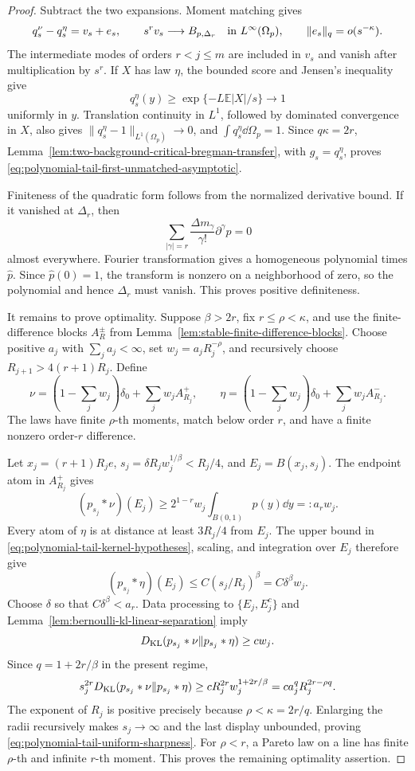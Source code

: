 \begin{proof}
Subtract the two expansions.  Moment matching gives
\[
 q_s^\nu-q_s^\eta=v_s+e_s,
 \qquad
 s^rv_s\longrightarrow B_{p,\Delta_r}\quad\hbox{in }L^\infty(\Omega_p),
 \qquad
 \|e_s\|_q=o(s^{-\kappa}).
\]
The intermediate modes of orders \(r<j\le m\) are included in \(v_s\)
and vanish after multiplication by \(s^r\).  If \(X\) has law \(\eta\),
the bounded score and Jensen's inequality give
\[
 q_s^\eta(y)\ge\exp\{-L\mathbb E|X|/s\}\longrightarrow1
\]
uniformly in \(y\).  Translation continuity in \(L^1\), followed by
dominated convergence in \(X\), also gives
\(\|q_s^\eta-1\|_{L^1(\Omega_p)}\to0\), and
\(\int q_s^\eta\dd\Omega_p=1\).  Since \(q\kappa=2r\),
Lemma~\ref{lem:two-background-critical-bregman-transfer}, with
\(g_s=q_s^\eta\), proves
\eqref{eq:polynomial-tail-first-unmatched-asymptotic}.

Finiteness of the quadratic form follows from the normalized derivative
bound.  If it vanished at \(\Delta_r\), then
\[
 \sum_{|\gamma|=r}\frac{\Delta m_\gamma}{\gamma!}\partial^\gamma p=0
\]
almost everywhere.  Fourier transformation gives a homogeneous polynomial
times \(\widehat p\).  Since \(\widehat p(0)=1\), the transform is nonzero
on a neighborhood of zero, so the polynomial and hence \(\Delta_r\) must
vanish.  This proves positive definiteness.

It remains to prove optimality.  Suppose \(\beta>2r\), fix
\(r\le\rho<\kappa\), and use the finite-difference blocks
\(A_R^\pm\) from Lemma~\ref{lem:stable-finite-difference-blocks}.  Choose
positive \(a_j\) with \(\sum_ja_j<\infty\), set
\(w_j=a_jR_j^{-\rho}\), and recursively choose
\(R_{j+1}>4(r+1)R_j\).  Define
\[
 \nu=\left(1-\sum_jw_j\right)\delta_0+\sum_jw_jA_{R_j}^+,
 \qquad
 \eta=\left(1-\sum_jw_j\right)\delta_0+\sum_jw_jA_{R_j}^-.
\]
The laws have finite \(\rho\)-th moments, match below order \(r\), and
have a finite nonzero order-\(r\) difference.

Let \(x_j=(r+1)R_je\),
\(s_j=\delta R_jw_j^{1/\beta}<R_j/4\), and
\(E_j=B(x_j,s_j)\).  The endpoint atom in \(A_{R_j}^+\) gives
\[
 (p_{s_j}*\nu)(E_j)\ge
 2^{1-r}w_j\int_{B(0,1)}p(y)\dd y=:a_rw_j.
\]
Every atom of \(\eta\) is at distance at least \(3R_j/4\) from \(E_j\).
The upper bound in \eqref{eq:polynomial-tail-kernel-hypotheses}, scaling,
and integration over \(E_j\) therefore give
\[
 (p_{s_j}*\eta)(E_j)
 \le C(s_j/R_j)^\beta=C\delta^\beta w_j.
\]
Choose \(\delta\) so that \(C\delta^\beta<a_r\).  Data processing to
\(\{E_j,E_j^c\}\) and
Lemma~\ref{lem:bernoulli-kl-linear-separation} imply
\[
 D_{\rm KL}(p_{s_j}*\nu\|p_{s_j}*\eta)\ge c w_j.
\]
Since \(q=1+2r/\beta\) in the present regime,
\[
 s_j^{2r}D_{\rm KL}(p_{s_j}*\nu\|p_{s_j}*\eta)
 \ge cR_j^{2r}w_j^{1+2r/\beta}
 =ca_j^qR_j^{2r-\rho q}.
\]
The exponent of \(R_j\) is positive precisely because
\(\rho<\kappa=2r/q\).  Enlarging the radii recursively makes \(s_j\to
\infty\) and the last display unbounded, proving
\eqref{eq:polynomial-tail-uniform-sharpness}.  For \(\rho<r\), a Pareto
law on a line has finite \(\rho\)-th and infinite \(r\)-th moment.  This
proves the remaining optimality assertion.


\end{proof}
